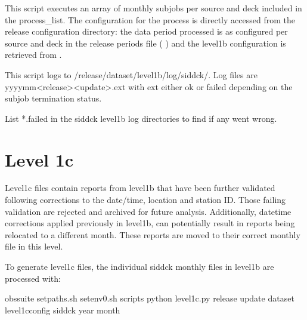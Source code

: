 \documentclass[letterpaper,10pt,english]{sphinxmanual}
\begin{document}
This script executes an array of monthly subjobs per source and deck included in
the process\_list. The configuration for the process is directly accessed from
the release configuration directory: the data period processed is as configured
per source and deck in the release periods file ( {\hyperref[\detokenize{index:release-periods-file}]{}})
and the level1b configuration is retrieved from {\hyperref[\detokenize{index:level1b-config-file}]{}}.

This script logs to /release/dataset/level1b/log/sid\sphinxhyphen{}dck/. Log files
are yyyy\sphinxhyphen{}mm\sphinxhyphen{}\textless{}release\textgreater{}\sphinxhyphen{}\textless{}update\textgreater{}.ext with ext either ok or failed depending on the
subjob termination status.

List  *.failed in the sid\sphinxhyphen{}dck level1b log directories to find if any went wrong.


\chapter{Level 1c}
\label{\detokenize{index:level-1c}}
Level1c files contain reports from level1b that have been further validated
following corrections to the date/time, location and station ID. Those failing
validation are rejected and archived for future analysis. Additionally, datetime
corrections applied previously in level1b, can potentially result in reports
being relocated to a different month. These reports are moved to their correct
monthly file in this level.

To generate level1c files, the individual sid\sphinxhyphen{}dck monthly files in level1b are
processed with:

\begin{sphinxVerbatim}[commandchars=\\\{\}]
 obs\PYGZhy{}suite
 setpaths.sh
 setenv0.sh
 scripts
python level1c.py  release update dataset level1c\PYGZus{}config sid\PYGZhy{}dck year month
\end{sphinxVerbatim}
\end{document}
